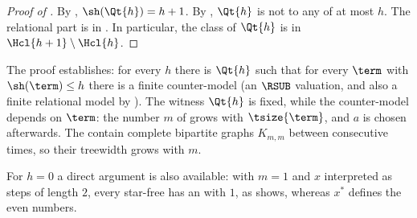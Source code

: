 \begin{proof}[Proof of ]
    By , $\sh(\Qt{h}) = h + 1$.
    By , $\Qt{h}$ is not  to any  of  at most $h$.
    The relational part is  in .
    In particular, the class of $\Qt{h}$ is in $\Hcl{h+1} \setminus \Hcl{h}$.
\end{proof}

\begin{remark}
    The proof establishes: for every $h$ there is $\Qt{h}$ such that for every $\term$ with $\sh(\term) \le h$ there is a finite counter-model (an $\RSUB$ valuation, and also a finite relational model by ).
    The witness $\Qt{h}$ is fixed, while the counter-model depends on $\term$: the number $m$ of  grows with $\tsize{\term}$, and $a$ is chosen afterwards.
    The  contain complete bipartite graphs $K_{m,m}$ between consecutive times, so their treewidth grows with $m$.
\end{remark}

\begin{remark}[The case $h = 0$]
    For $h = 0$ a direct argument is also available:
    with $m = 1$ and $x$ interpreted as steps of length $2$, every star-free  has an   with  $1$, as  shows,
    whereas $x^{*}$ defines the even numbers.
\end{remark}
